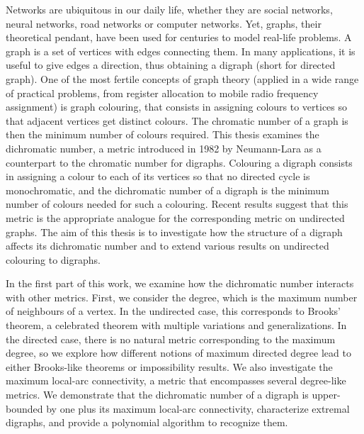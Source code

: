 \vspace{0.4cm}
{\small Networks are ubiquitous in our daily life, whether they are social networks, neural networks, road networks or computer networks. Yet, graphs, their theoretical pendant, have been used for centuries to model real-life problems. A graph is a set of vertices with edges connecting them. In many applications, it is useful to give edges a direction, thus obtaining a digraph (short for directed graph). One of the most fertile concepts of graph theory (applied in a wide range of practical problems, from register allocation to mobile radio frequency assignment) is graph colouring, that consists in assigning colours to vertices so that adjacent vertices get distinct colours. The chromatic number of a graph is then the minimum number of colours required. This thesis examines the dichromatic number, a metric introduced in 1982 by Neumann-Lara as a counterpart to the chromatic number for digraphs. Colouring a digraph consists in assigning a colour to each of its vertices so that no directed cycle is monochromatic, and the dichromatic number of a digraph is the minimum number of colours needed for such a colouring. Recent results suggest that this metric is the appropriate analogue for the corresponding metric on undirected graphs. The aim of this thesis is to investigate how the structure of a digraph affects its dichromatic number and to extend various results on undirected colouring to digraphs.

\vspace{0.2cm}
In the first part of this work, we examine how the dichromatic number interacts with other metrics. First, we consider the degree, which is the maximum number of neighbours of a vertex. In the undirected case, this corresponds to Brooks' theorem, a celebrated theorem with multiple variations and generalizations. In the directed case, there is no natural metric corresponding to the maximum degree, so we explore how different notions of maximum directed degree lead to either Brooks-like theorems or impossibility results. We also investigate the maximum local-arc connectivity, a metric that encompasses several degree-like metrics. We demonstrate that the dichromatic number of a digraph is upper-bounded by one plus its maximum local-arc connectivity, characterize extremal digraphs, and provide a polynomial algorithm to recognize them.

}
